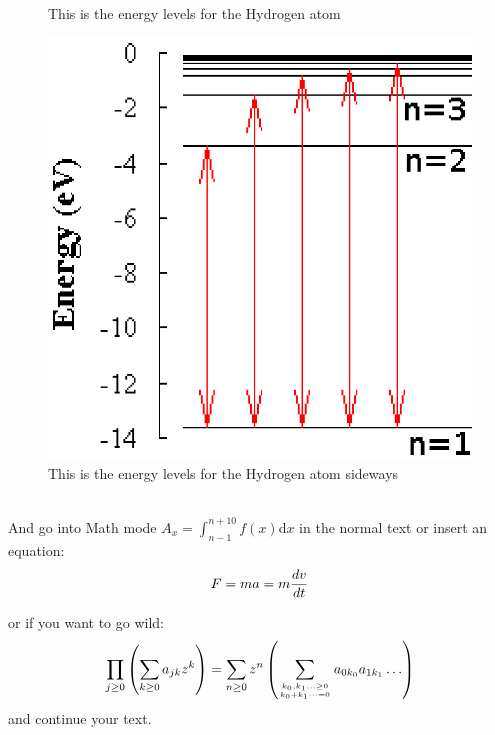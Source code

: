 \documentclass[12pt]{article}
\begin{document}
\begin{figure}[h!]
\begin{center}
\end{center}
\caption{This is the energy levels for the Hydrogen atom}
\end{figure}
\begin{figure}[h]
\begin{center}
\includegraphics[scale=0.6,angle=90]{hydrogen.eps} 
\end{center}
\caption{This is the energy levels for the Hydrogen atom sideways
\label{figure:map}}
\end{figure}


 \\

And go into Math mode $A_x = \int_{n-1}^{n+10}  f(x) \mathrm{d}x$ 
in the normal text or insert an equation:
\begin{equation}
	F = ma \\
	   =m \frac{dv}{dt} 
\end{equation}


or if you want to go wild:
\begin{equation}
\prod_{j\ge0}\left( \sum_{k\ge0} a_{jk}z^k \right) = \sum_{n\ge0} z^n 
\left( \sum_{k_0,k_1\ldots\ge0 \atop k_0+k_1\cdots=0} a_{0k_0} a_{1k_1}\ldots \right)
\end{equation}
and continue your text.
\end{document}
